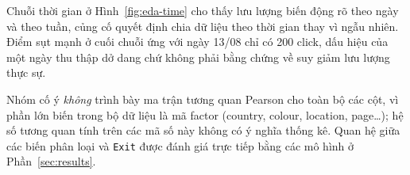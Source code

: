 Chuỗi thời gian ở Hình~\ref{fig:eda-time} cho thấy lưu lượng biến động rõ theo
ngày và theo tuần, củng cố quyết định chia dữ liệu theo thời gian thay vì ngẫu
nhiên. Điểm sụt mạnh ở cuối chuỗi ứng với ngày 13/08 chỉ có 200 click, dấu hiệu
của một ngày thu thập dở dang chứ không phải bằng chứng về suy giảm lưu lượng
thực sự.

Nhóm cố ý \emph{không} trình bày ma trận tương quan Pearson cho toàn bộ các cột,
vì phần lớn biến trong bộ dữ liệu là mã factor (country, colour, location,
page\ldots); hệ số tương quan tính trên các mã số này không có ý nghĩa thống kê.
Quan hệ giữa các biến phân loại và \texttt{Exit} được đánh giá trực tiếp bằng các
mô hình ở Phần~\ref{sec:results}.
